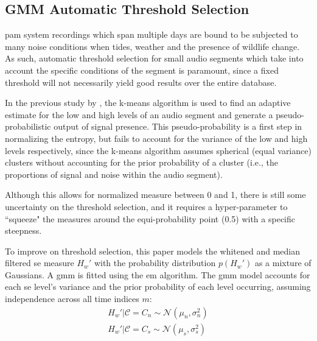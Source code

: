 {%


\subsection{GMM Automatic Threshold Selection}
\Ac{pam} system recordings which span multiple days are bound to be subjected to many noise conditions when tides, weather and the presence of wildlife change. As such, automatic threshold selection for small audio segments which take into account the specific conditions of the segment is paramount, since a fixed threshold will not necessarily yield good results over the entire database.

In the previous study by \citet{mypaper}, the k-means algorithm \citep{origkmeans} is used to find an adaptive estimate for the low and high levels of an audio segment and generate a pseudo-probabilistic output of signal presence. This pseudo-probability is a first step in normalizing the entropy, but fails to account for the variance of the low and high levels respectively, since the k-means algorithm assumes spherical (equal variance) clusters without accounting for the prior probability of a cluster (i.e., the proportions of signal and noise within the audio segment).

Although this allows for normalized measure between 0 and 1, there is still some uncertainty on the threshold selection, and it requires a hyper-parameter to  ``squeeze" the measures around the equi-probability point (0.5) with a specific steepness.

To improve on threshold selection, this paper models the whitened and median filtered \ac{se} measure $H_w'$ with the probability distribution $p(H_w')$ as a mixture of Gaussians. A \ac{gmm} is fitted using the \ac{em} algorithm. The \ac{gmm} model accounts for each \ac{se} level's variance and the prior probability of each level occurring, assuming independence across all time indices $m$:
\begin{gather}
    H_w' | \mathcal{C} = C_n \sim \mathcal{N}(\mu_n, \sigma_n^2) \\   
    H_w' | \mathcal{C} = C_s \sim \mathcal{N}(\mu_s, \sigma_s^2)
\end{gather}

}
